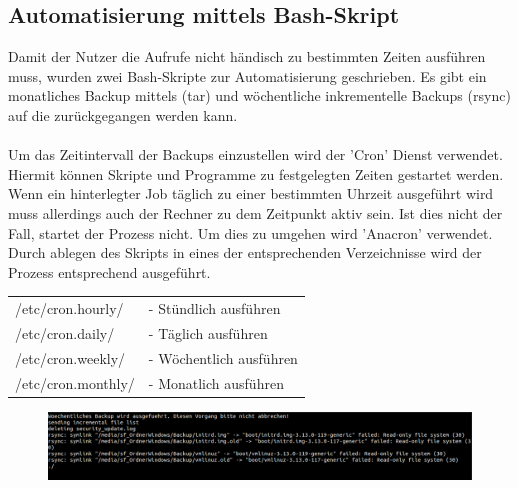 \subsection{Automatisierung mittels Bash-Skript} %
Damit der Nutzer die Aufrufe nicht händisch zu bestimmten Zeiten ausführen muss, wurden zwei Bash-Skripte zur Automatisierung geschrieben. Es gibt ein monatliches Backup mittels (tar) und wöchentliche inkrementelle Backups (rsync) auf die zurückgegangen werden kann.\\
\\
Um das Zeitintervall der Backups einzustellen wird der 'Cron' Dienst verwendet.
Hiermit können Skripte und Programme zu festgelegten Zeiten gestartet werden.
Wenn ein hinterlegter Job täglich zu einer bestimmten Uhrzeit ausgeführt wird muss allerdings auch der Rechner zu dem Zeitpunkt aktiv sein. Ist dies nicht der Fall, startet der Prozess nicht. Um dies zu umgehen wird 'Anacron' verwendet.
Durch ablegen des Skripts in eines der entsprechenden Verzeichnisse wird der Prozess entsprechend ausgeführt.\\
\begin{tabular}{l l}
/etc/cron.hourly/	&- Stündlich ausführen\\
/etc/cron.daily/	&- Täglich ausführen\\
/etc/cron.weekly/	&- Wöchentlich ausführen\\
/etc/cron.monthly/	&- Monatlich ausführen\\
\end{tabular}
\begin{figure}[ht]
\includegraphics[width=\textwidth]{pictures/Bastian/Woechentliches_Backup}
\end{figure}












